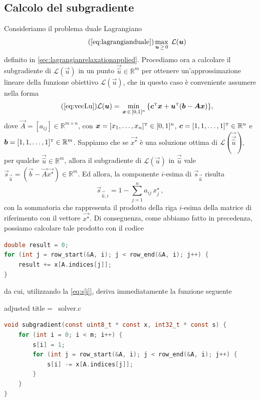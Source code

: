 \subsection{Calcolo del subgradiente}
Consideriamo il problema duale Lagrangiano
\begin{equation}\tag{\ref{eq:lagrangianduale}}
    \max_{\vec{u} \,\geq\, 0}\; \mathcal{L}(\vec{u})
\end{equation}
definito in \ref{sec:lagrangianrelaxationapplied}.
Procediamo ora a calcolare il subgradiente di \(
\mathcal{L}(\vec{u}) \) in un punto \( \vec{\hat{u}} \in \mathbb{R}^m\) per ottenere un'approssimazione lineare della funzione obiettivo
\( \mathcal{L}(\vec{u}) \), che in questo caso è conveniente assumere nella forma
\begin{equation}
\tag{\ref{eq:vecLu}}
    \mathcal{L}(\vec{u}) = \min_{\,\vec{x} \,\in\,[0, 1]^n}\, \{\vec{c}^{\tr}\vec{x} +
    \vec{u}^{\tr}(\vec{b}-\vec{A}\vec{x})\},
\end{equation}
dove \( \vec{A} = [a_{ij}] \in \mathbb{R}^{m\times n}\), con \( \bm{x} = [x_1, \ldots, x_n]^{\scriptscriptstyle\mathrm{T}} \in
[0, 1]^n \), \( \bm{c} = [1, 1, \ldots, 1]^{\scriptscriptstyle\mathrm{T}} \in \mathbb{R}^n \) e \( \bm{b} = [1, 1, \ldots, 1]^{\scriptscriptstyle\mathrm{T}} \in
\mathbb{R}^m \).
Sappiamo che se \( \vec{x^{\star}} \) è una soluzione ottima di \( \mathcal{L}(\vec{\vec{\hat{u}}}) \), per qualche \(
\vec{\hat{u}} \in \mathbb{R}^m \), allora il subgradiente di \( \mathcal{L}(\vec{u}) \) in \( \vec{\hat{u}} \) vale \(
\vec{s}_{\vec{\hat{u}}} = (\vec{b} - \vec{A}\vec{x^{\star}}) \in \mathbb{R}^m \). Ed allora, la componente \( i \)-esima
di \( \vec{s}_{\vec{\hat{u}}} \) risulta
\begin{equation}\label{eq:s[i]}
    \vec{s}_{\vec{\hat{u}}, i} = 1 - \sum_{j = 1}^n a_{ij}\,x^{\star}_j\,,
\end{equation}
con la sommatoria che rappresenta il prodotto della riga \( i \)-esima della matrice di riferimento con il vettore  \(
\vec{x^{\star}} \). Di conseguenza, come abbiamo fatto in precedenza, possiamo calcolare tale prodotto con il codice
\begin{inline}
\begin{lstlisting}[style = style2, language=c]
double result = 0;
for (int j = row_start(&A, i); j < row_end(&A, i); j++) {
    result += x[A.indices[j]];
}
\end{lstlisting}
\end{inline}
\noindent
da cui, utilizzando la \eqref{eq:s[i]}, deriva immediatamente la funzione seguente
\begin{code}{adjusted title = {\cicon\ solver.c}}
\begin{lstlisting}[language=c, style = style, caption={Calcolo del subgradiente \( \vec{s}_k \) di \(
\mathcal{L}(\vec{u}) \) in \( \vec{u}_k \).}]
void subgradient(const uint8_t * const x, int32_t * const s) {
    for (int i = 0; i < m; i++) {
        s[i] = 1;
        for (int j = row_start(&A, i); j < row_end(&A, i); j++) {
            s[i] -= x[A.indices[j]];
        }
    }
}
\end{lstlisting}
\end{code}

